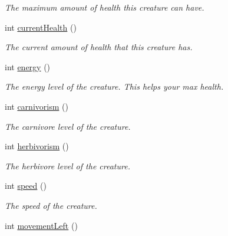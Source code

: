 \begin{DoxyCompactItemize}
\begin{DoxyCompactList}\small\item\em \-The maximum amount of health this creature can have. \end{DoxyCompactList}\item 
\hypertarget{classCreature_a0fd41611210e3a6b2136274be9f309fd}{int \hyperlink{classCreature_a0fd41611210e3a6b2136274be9f309fd}{current\-Health} ()}\label{classCreature_a0fd41611210e3a6b2136274be9f309fd}

\begin{DoxyCompactList}\small\item\em \-The current amount of health that this creature has. \end{DoxyCompactList}\item 
\hypertarget{classCreature_a1015cf916bbc314c79ebac49e1a3f3dc}{int \hyperlink{classCreature_a1015cf916bbc314c79ebac49e1a3f3dc}{energy} ()}\label{classCreature_a1015cf916bbc314c79ebac49e1a3f3dc}

\begin{DoxyCompactList}\small\item\em \-The energy level of the creature. \-This helps your max health. \end{DoxyCompactList}\item 
\hypertarget{classCreature_aa9fe9997f1f46ed8ea6467d48caafd87}{int \hyperlink{classCreature_aa9fe9997f1f46ed8ea6467d48caafd87}{carnivorism} ()}\label{classCreature_aa9fe9997f1f46ed8ea6467d48caafd87}

\begin{DoxyCompactList}\small\item\em \-The carnivore level of the creature. \end{DoxyCompactList}\item 
\hypertarget{classCreature_a75ee772d9dcb4f0989e53dde71f42c21}{int \hyperlink{classCreature_a75ee772d9dcb4f0989e53dde71f42c21}{herbivorism} ()}\label{classCreature_a75ee772d9dcb4f0989e53dde71f42c21}

\begin{DoxyCompactList}\small\item\em \-The herbivore level of the creature. \end{DoxyCompactList}\item 
\hypertarget{classCreature_acd30689dadca114bd7239c0a91369252}{int \hyperlink{classCreature_acd30689dadca114bd7239c0a91369252}{speed} ()}\label{classCreature_acd30689dadca114bd7239c0a91369252}

\begin{DoxyCompactList}\small\item\em \-The speed of the creature. \end{DoxyCompactList}\item 
\hypertarget{classCreature_a1de0f285b90641250153fd1973f9fc4a}{int \hyperlink{classCreature_a1de0f285b90641250153fd1973f9fc4a}{movement\-Left} ()}\label{classCreature_a1de0f285b90641250153fd1973f9fc4a}


\end{DoxyCompactItemize}
